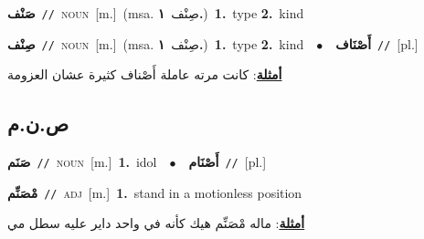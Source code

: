 \documentclass[10pt,a4paper,twoside]{article} %
\begin{document}
\begin{multicols}{2}
{\setlength\topsep{0pt}\textbf{\foreignlanguage{arabic}{صَنْف}}\ {\color{gray}\texttt{//}\color{black}}\ \textsc{noun}\ [m.]\ \color{gray}(msa. \foreignlanguage{arabic}{صِنْف}~\foreignlanguage{arabic}{\textbf{١.}})\color{black}\ \textbf{1.}~type  \textbf{2.}~kind\ } \vspace{2mm}

{\setlength\topsep{0pt}\textbf{\foreignlanguage{arabic}{صِنْف}}\ {\color{gray}\texttt{//}\color{black}}\ \textsc{noun}\ [m.]\ \color{gray}(msa. \foreignlanguage{arabic}{صِنْف}~\foreignlanguage{arabic}{\textbf{١.}})\color{black}\ \textbf{1.}~type  \textbf{2.}~kind\ \ $\bullet$\ \ \setlength\topsep{0pt}\textbf{\foreignlanguage{arabic}{أَصْنَاف}}\ {\color{gray}\texttt{//}\color{black}}\ [pl.]\  \begin{flushright}\color{gray}\foreignlanguage{arabic}{\textbf{\underline{\foreignlanguage{arabic}{أمثلة}}}: كانت مرته عاملة أَصْناف كثيرة عشان العزومة}\end{flushright}\color{black}} \vspace{2mm}

\vspace{-3mm}
\subsection*{\color{blue}\foreignlanguage{arabic}{ص.ن.م}\color{blue}{}} 

{\setlength\topsep{0pt}\textbf{\foreignlanguage{arabic}{صَنَم}}\ {\color{gray}\texttt{//}\color{black}}\ \textsc{noun}\ [m.]\ \textbf{1.}~idol\ \ $\bullet$\ \ \setlength\topsep{0pt}\textbf{\foreignlanguage{arabic}{أَصْنَام}}\ {\color{gray}\texttt{//}\color{black}}\ [pl.]\ } \vspace{2mm}

{\setlength\topsep{0pt}\textbf{\foreignlanguage{arabic}{مْصَنِّم}}\ {\color{gray}\texttt{//}\color{black}}\ \textsc{adj}\ [m.]\ \textbf{1.}~stand in a motionless position\  \begin{flushright}\color{gray}\foreignlanguage{arabic}{\textbf{\underline{\foreignlanguage{arabic}{أمثلة}}}: ماله مْصَنِّم هيك كأنه في واحد داير عليه سطل مي}\end{flushright}\color{black}} \vspace{2mm}


\end{multicols}
\end{document}
